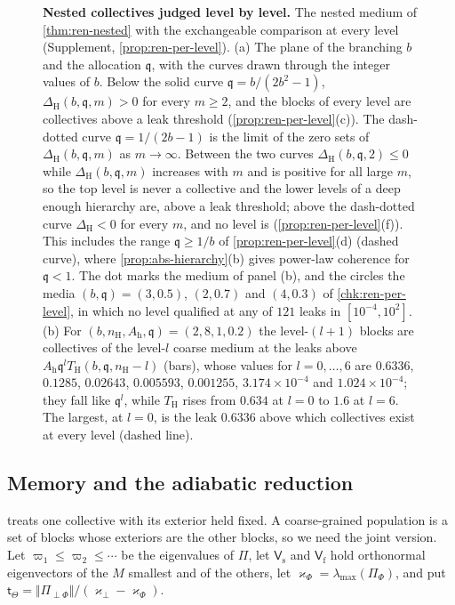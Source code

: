 \begin{figure}[!t]
  \centering
  
  \caption{\textbf{Nested collectives judged level by level.} The nested medium of \cref{thm:ren-nested} with the exchangeable comparison at every level (Supplement, \cref{prop:ren-per-level}). (a) The plane of the branching $b$ and the allocation $\mathfrak q$, with the curves drawn through the integer values of $b$. Below the solid curve $\mathfrak q=b/(2b^2-1)$, $\Delta_{\mathrm H}(b,\mathfrak q,m)>0$ for every $m\ge2$, and the blocks of every level are collectives above a leak threshold (\cref{prop:ren-per-level}(c)). The dash-dotted curve $\mathfrak q=1/(2b-1)$ is the limit of the zero sets of $\Delta_{\mathrm H}(b,\mathfrak q,m)$ as $m\to\infty$. Between the two curves $\Delta_{\mathrm H}(b,\mathfrak q,2)\le0$ while $\Delta_{\mathrm H}(b,\mathfrak q,m)$ increases with $m$ and is positive for all large $m$, so the top level is never a collective and the lower levels of a deep enough hierarchy are, above a leak threshold; above the dash-dotted curve $\Delta_{\mathrm H}<0$ for every $m$, and no level is (\cref{prop:ren-per-level}(f)). This includes the range $\mathfrak q\ge1/b$ of \cref{prop:ren-per-level}(d) (dashed curve), where \cref{prop:abs-hierarchy}(b) gives power-law coherence for $\mathfrak q<1$. The dot marks the medium of panel (b), and the circles the media $(b,\mathfrak q)=(3,0.5)$, $(2,0.7)$ and $(4,0.3)$ of \cref{chk:ren-per-level}, in which no level qualified at any of $121$ leaks in $[10^{-4},10^2]$. (b) For $(b,n_{\mathrm H},A_{\mathrm h},\mathfrak q)=(2,8,1,0.2)$ the level-$(l+1)$ blocks are collectives of the level-$l$ coarse medium at the leaks above $A_{\mathrm h}\mathfrak q^lT_{\mathrm H}(b,\mathfrak q,n_{\mathrm H}-l)$ (bars), whose values for $l=0,\dots,6$ are $0.6336$, $0.1285$, $0.02643$, $0.005593$, $0.001255$, $3.174\times10^{-4}$ and $1.024\times10^{-4}$; they fall like $\mathfrak q^l$, while $T_{\mathrm H}$ rises from $0.634$ at $l=0$ to $1.6$ at $l=6$. The largest, at $l=0$, is the leak $0.6336$ above which collectives exist at every level (dashed line).}
  \label{fig:ren-per-level}
\end{figure}

\subsection{Memory and the adiabatic reduction}\label{sec:ren-memory}

 treats one collective with its exterior held fixed. A coarse-grained population is a set of blocks whose exteriors are the other blocks, so we need the joint version. Let $\varpi_1\le\varpi_2\le\cdots$ be the eigenvalues of $\Pi$, let $\mathsf V_{\mathrm s}$ and $\mathsf V_{\mathrm f}$ hold orthonormal eigenvectors of the $M$ smallest and of the others, let $\varkappa_\Phi=\lambda_{\max}(\Pi_\Phi)$, and put $\mathsf t_\Theta=\Vert\Pi_{\perp\Phi}\Vert/(\varkappa_\perp-\varkappa_\Phi)$.

